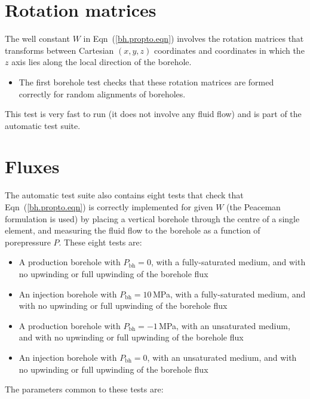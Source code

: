 \documentclass[]{scrreprt}
\begin{document}
\section{Rotation matrices}
The well constant $W$ in Eqn~(\ref{bh.propto.eqn})
involves the rotation matrices that transforms between Cartesian
$(x,y,z)$ coordinates and coordinates in which the $z$ axis lies along
the local direction of the borehole.
\begin{itemize}
\item The first borehole test checks that these rotation matrices are
  formed correctly for random alignments of boreholes.
\end{itemize}
This test is very fast to run (it does not involve any fluid flow) and
is part of the automatic test suite.

\section{Fluxes}
The automatic test suite also contains eight tests that check that
Eqn~(\ref{bh.propto.eqn}) is correctly implemented for given $W$ (the
Peaceman formulation is used) by placing a vertical borehole through
the centre of a single element, and measuring the fluid flow to the
borehole as a function of porepressure $P$.  These eight tests are:
\begin{itemize}
\item A production borehole with $P_{\mathrm{bh}} = 0$, with a
  fully-saturated medium, and with no upwinding or full upwinding of the borehole flux
\item An injection borehole with $P_{\mathrm{bh}} = 10$\,MPa, with a
  fully-saturated medium, and with no upwinding or full upwinding of the borehole flux
\item A production borehole with $P_{\mathrm{bh}} = -1$\,MPa, with an
  unsaturated medium, and with no upwinding or full upwinding of the borehole flux
\item An injection borehole with $P_{\mathrm{bh}} = 0$, with an
  unsaturated medium, and with no upwinding or full upwinding of the borehole flux
\end{itemize}
The parameters common to these tests are:
\end{document}
